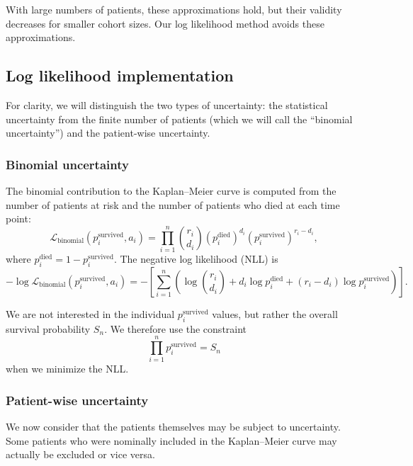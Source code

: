 \documentclass[article]{jss}
\newcommand{\KM}{Kaplan--Meier} %
\begin{document}
With large numbers of patients, these approximations hold, but their validity decreases for smaller cohort sizes.  Our log likelihood method avoids these approximations.

\subsection{Log likelihood implementation}

For clarity, we will distinguish the two types of uncertainty: the statistical uncertainty from the finite number of patients (which we will call the ``binomial uncertainty'') and the patient-wise uncertainty.

\subsubsection{Binomial uncertainty}\label{sec:binomial-uncertainty}

The binomial contribution to the \KM{} curve is computed from the number of patients at risk and the number of patients who died at each time point:
\begin{equation}
\mathcal{L}_{\text{binomial}}(p_i^\text{survived}, a_i) = \prod_{i=1}^{n} \binom{r_i}{d_i} {\left(p_i^\text{died}\right)}^{d_i} {\left(p_i^\text{survived}\right)}^{r_i-d_i},
\end{equation}
where \(p_i^\text{died} = 1 - p_i^\text{survived}\).  The negative log likelihood (NLL) is
\begin{equation}
-\log \mathcal{L}_{\text{binomial}}(p_i^\text{survived}, a_i) = -\left[\sum_{i=1}^{n} \left( \log\binom{r_i}{d_i} + d_i \log p_i^\text{died} + (r_i-d_i) \log p_i^\text{survived} \right)\right]. \label{eq:binomial-nll}
\end{equation}

We are not interested in the individual \(p_i^\text{survived}\) values, but rather the overall survival probability \(S_n\).  We therefore use the constraint
\begin{equation}
\prod_{i=1}^{n} p_i^\text{survived} = S_n \label{eq:km-probability-constraint}
\end{equation}
when we minimize the NLL\@.

\subsubsection{Patient-wise uncertainty}\label{sec:patient-wise-uncertainty}

We now consider that the patients themselves may be subject to uncertainty.  Some patients who were nominally included in the \KM{} curve may actually be excluded or vice versa.
\end{document}
